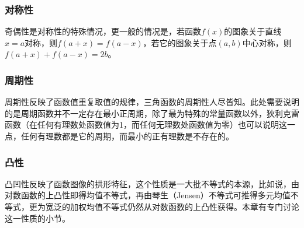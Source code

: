 \subsubsection{对称性}
\label{sec:symmetric-of-function}

奇偶性是对称性的特殊情况，更一般的情况是，若函数$f(x)$的图象关于直线$x=a$对称，则$f(a+x)=f(a-x)$，若它的图象关于点$(a,b)$中心对称，则$f(a+x)+f(a-x)=2b$。

\subsubsection{周期性}
\label{sec:periodicity-of-function}

周期性反映了函数值重复取值的规律，三角函数的周期性人尽皆知。此处需要说明的是周期函数并不一定存在最小正周期，除了最为特殊的常量函数以外，狄利克雷函数（在任何有理数处函数值为1，而任何无理数处函数值为零）也可以说明这一点，任何有理数都是它的周期，而最小的正有理数是不存在的。

\subsubsection{凸性}
\label{sec:convex-property-of-function}

凸凹性反映了函数图像的拱形特征，这个性质是一大批不等式的本源，比如说，由对数函数的上凸性即得均值不等式，再由琴生（Jensen）不等式可推得多元均值不等式，更为宽泛的加权均值不等式仍然从对数函数的上凸性获得。本章有专门讨论这一性质的小节。

